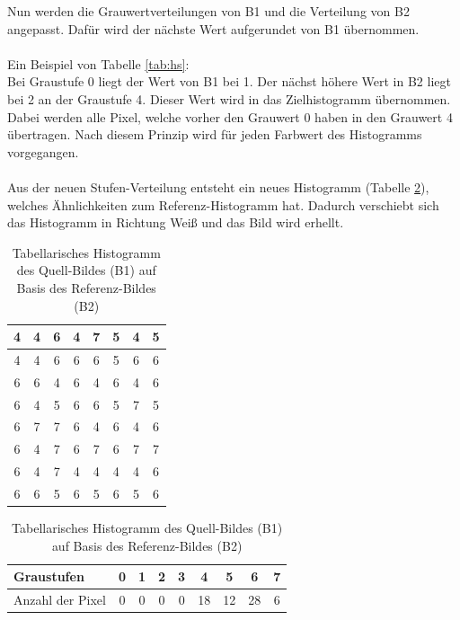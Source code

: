 Nun werden die Grauwertverteilungen von B1 und die Verteilung von B2 angepasst. Dafür wird der nächste Wert aufgerundet von B1 übernommen.\\\\
Ein Beispiel von Tabelle \ref{tab:hs}: \\
Bei Graustufe 0 liegt der Wert von B1 bei 1. Der nächst höhere Wert in B2 liegt bei 2 an der Graustufe 4. Dieser Wert wird in das Zielhistogramm übernommen. Dabei werden alle Pixel, welche vorher den Grauwert 0 haben in den Grauwert 4 übertragen. Nach diesem Prinzip wird für jeden Farbwert des Histogramms vorgegangen.\\\\
Aus der neuen Stufen-Verteilung entsteht ein neues Histogramm (Tabelle \ref{tab:B3}), welches Ähnlichkeiten zum Referenz-Histogramm hat. Dadurch verschiebt sich das Histogramm in Richtung Weiß und das Bild wird erhellt.
  \begin{table}
  [h]
  \caption{Tabellarisches Histogramm des Quell-Bildes (B1) auf Basis des Referenz-Bildes (B2)}
  \label{tab:B3}
  \centering
  \begin{minipage}{\textwidth}
  \center
  \begin{tabular}{|c|c|c|c|c|c|c|c|}
  \hline
  4&4&6&4&7&5&4&5\\
  \hline
  4&4&6&6&6&5&6&6\\
  \hline
  6&6&4&6&4&6&4&6\\
  \hline
  6&4&5&6&6&5&7&5\\
  \hline
  6&7&7&6&4&6&4&6\\
  \hline
  6&4&7&6&7&6&7&7\\
  \hline
  6&4&7&4&4&4&4&6\\
  \hline
  6&6&5&6&5&6&5&6\\
  \hline
  \end{tabular}
  \end{minipage}
  \begin{minipage}{\textwidth}
  \hspace{\textwidth}
  \end{minipage}
  \begin{minipage}{\textwidth}
  \center
  \begin{tabular}{|l|c|c|c|c|c|c|c|c|}
  \hline
  Graustufen & 0 & 1 & 2 & 3 & 4 & 5 & 6 & 7\\
  \hline
  Anzahl der Pixel & 0 & 0 & 0 & 0 & 18 & 12 & 28 & 6\\
  \hline
  \end{tabular}
  \end{minipage}
  \end{table}